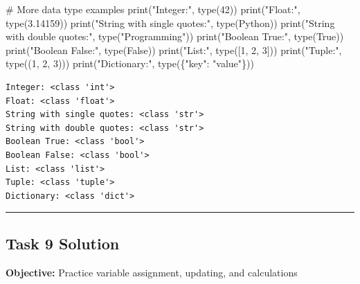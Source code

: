 \documentclass[
  11pt,
]{article}
\newenvironment{Shaded}{\begin{snugshade}}{\end{snugshade}}
\newcommand{\BuiltInTok}[1]{\textcolor[rgb]{0.00,0.23,0.31}{#1}}
\newcommand{\CommentTok}[1]{\textcolor[rgb]{0.37,0.37,0.37}{#1}}
\newcommand{\DecValTok}[1]{\textcolor[rgb]{0.68,0.00,0.00}{#1}}
\newcommand{\FloatTok}[1]{\textcolor[rgb]{0.68,0.00,0.00}{#1}}
\newcommand{\NormalTok}[1]{\textcolor[rgb]{0.00,0.23,0.31}{#1}}
\newcommand{\StringTok}[1]{\textcolor[rgb]{0.13,0.47,0.30}{#1}}
\newcommand{\VariableTok}[1]{\textcolor[rgb]{0.07,0.07,0.07}{#1}}
\begin{document}
\begin{Shaded}
\begin{Highlighting}[]
\CommentTok{\# More data type examples}
\BuiltInTok{print}\NormalTok{(}\StringTok{"Integer:"}\NormalTok{, }\BuiltInTok{type}\NormalTok{(}\DecValTok{42}\NormalTok{))}
\BuiltInTok{print}\NormalTok{(}\StringTok{"Float:"}\NormalTok{, }\BuiltInTok{type}\NormalTok{(}\FloatTok{3.14159}\NormalTok{))}
\BuiltInTok{print}\NormalTok{(}\StringTok{"String with single quotes:"}\NormalTok{, }\BuiltInTok{type}\NormalTok{(}\StringTok{\textquotesingle{}Python\textquotesingle{}}\NormalTok{))}
\BuiltInTok{print}\NormalTok{(}\StringTok{"String with double quotes:"}\NormalTok{, }\BuiltInTok{type}\NormalTok{(}\StringTok{"Programming"}\NormalTok{))}
\BuiltInTok{print}\NormalTok{(}\StringTok{"Boolean True:"}\NormalTok{, }\BuiltInTok{type}\NormalTok{(}\VariableTok{True}\NormalTok{))}
\BuiltInTok{print}\NormalTok{(}\StringTok{"Boolean False:"}\NormalTok{, }\BuiltInTok{type}\NormalTok{(}\VariableTok{False}\NormalTok{))}
\BuiltInTok{print}\NormalTok{(}\StringTok{"List:"}\NormalTok{, }\BuiltInTok{type}\NormalTok{([}\DecValTok{1}\NormalTok{, }\DecValTok{2}\NormalTok{, }\DecValTok{3}\NormalTok{]))}
\BuiltInTok{print}\NormalTok{(}\StringTok{"Tuple:"}\NormalTok{, }\BuiltInTok{type}\NormalTok{((}\DecValTok{1}\NormalTok{, }\DecValTok{2}\NormalTok{, }\DecValTok{3}\NormalTok{)))}
\BuiltInTok{print}\NormalTok{(}\StringTok{"Dictionary:"}\NormalTok{, }\BuiltInTok{type}\NormalTok{(\{}\StringTok{"key"}\NormalTok{: }\StringTok{"value"}\NormalTok{\}))}
\end{Highlighting}
\end{Shaded}

\begin{verbatim}
Integer: <class 'int'>
Float: <class 'float'>
String with single quotes: <class 'str'>
String with double quotes: <class 'str'>
Boolean True: <class 'bool'>
Boolean False: <class 'bool'>
List: <class 'list'>
Tuple: <class 'tuple'>
Dictionary: <class 'dict'>
\end{verbatim}

\begin{center}\rule{0.5\linewidth}{0.5pt}\end{center}

\subsection{Task 9 Solution}\label{task-9-solution}

\textbf{Objective:} Practice variable assignment, updating, and
calculations
\end{document}

